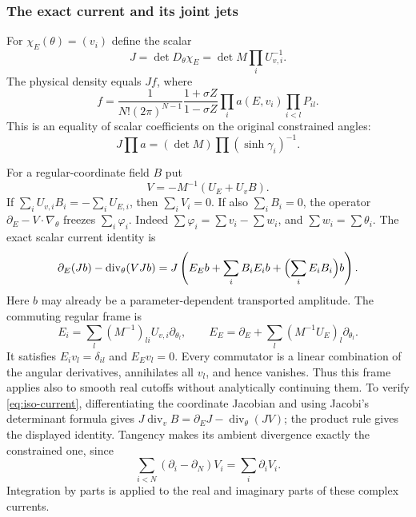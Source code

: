\documentclass[11pt]{article}
\numberwithin{equation}{section}
\theoremstyle{definition}
\begin{document}
\subsubsection{The exact current and its joint jets}

For $\chi_{{E}}(\theta)=(v_i)$ define the scalar
\[
 J=\det D_\theta\chi_{{E}}
    =\det M\prod_i U_{v,i}^{-1}.
\]
The physical density equals $Jf$, where
\begin{equation}\label{eq:iso-regular-density}
 f=\frac1{N!(2\pi)^{N-1}}
       \frac{1+\sigma Z}{1-\sigma Z}
       \prod_i a({E},v_i)\prod_{i<l}P_{il}.
\end{equation}
This is an equality of scalar coefficients on the original constrained
angles:
\[J\prod a=(\det M)\prod(\sinh\gamma_i)^{-1}.\]

For a regular-coordinate field $B$ put
\begin{equation}\label{eq:iso-angular-field}
 V=-M^{-1}(U_{{E}}+U_vB).
\end{equation}
If $\sum_iU_{v,i}B_i=-\sum_iU_{{E},i}$, then $\sum_iV_i=0$.
If also $\sum_iB_i=0$, the operator
$\partial_{{E}}-V\cdot\nabla_\theta$ freezes $\sum_i\varphi_i$.
Indeed $\sum\varphi_i=\sum v_i-\sum w_i$, and $\sum w_i=\sum\theta_i$.
The exact scalar current identity is
\begin{equation}\label{eq:iso-current}
 \partial_{{E}}(Jb)-\operatorname{div}_\theta(VJb)
  =J\left(E_{{E}}b+\sum_i B_iE_i b
                           +\Bigl(\sum_iE_iB_i\Bigr)b\right).
\end{equation}
Here $b$ may already be a parameter-dependent transported amplitude.
The commuting regular frame is
\[
 E_i=\sum_l(M^{-1})_{li}U_{v,i}\partial_{\theta_l},\qquad
 E_{{E}}=\partial_{{E}}
                  +\sum_l(M^{-1}U_{{E}})_l\partial_{\theta_l}.
\]
It satisfies $E_i v_l=\delta_{il}$ and $E_{{E}}v_l=0$.
Every commutator is a linear combination of the angular derivatives,
annihilates all $v_l$, and hence vanishes.  Thus this frame applies
also to smooth real cutoffs without analytically continuing them.
To verify \eqref{eq:iso-current}, differentiating the coordinate
Jacobian and using Jacobi's determinant formula gives
$J\operatorname{div}_vB=\partial_{{E}}J-\operatorname{div}_\theta(JV)$;
the product rule gives the displayed identity.  Tangency makes its
ambient divergence exactly the constrained one, since
\[
 \sum_{i<N}(\partial_i-\partial_N)V_i=\sum_i\partial_iV_i.
\]
Integration by parts is applied to the real and imaginary parts of
these complex currents.
\end{document}
